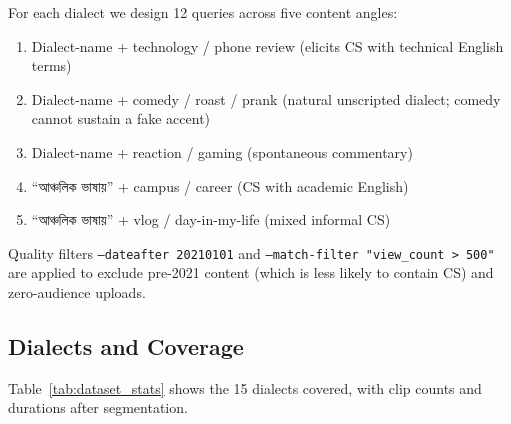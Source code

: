 For each dialect we design 12 queries across five content angles:
\begin{enumerate}[label=\Alph*., leftmargin=2em, itemsep=1pt]
  \item Dialect-name + technology / phone review (elicits CS with technical
        English terms)
  \item Dialect-name + comedy / roast / prank (natural unscripted dialect;
        comedy cannot sustain a fake accent)
  \item Dialect-name + reaction / gaming (spontaneous commentary)
  \item ``আঞ্চলিক ভাষায়'' + campus / career (CS with academic English)
  \item ``আঞ্চলিক ভাষায়'' + vlog / day-in-my-life (mixed informal CS)
\end{enumerate}

Quality filters \texttt{--dateafter 20210101} and
\texttt{--match-filter "view\_count > 500"} are applied to exclude pre-2021
content (which is less likely to contain CS) and zero-audience uploads.

\subsection{Dialects and Coverage}

Table~\ref{tab:dataset_stats} shows the 15 dialects covered, with clip counts
and durations after segmentation.

